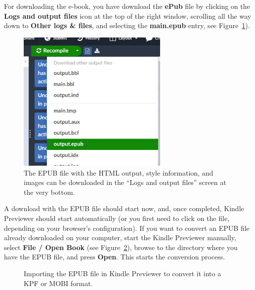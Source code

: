 For downloading the e-book, you have download the \textbf{ePub} file by clicking on the \textbf{Logs and output files} icon at the top of the right window, scrolling all the way down to \textbf{Other logs \& files}, and selecting the \textbf{main.epub} entry, see Figure~\ref{downloadepub:fig}). 

\begin{figure}[H]\centering
\includegraphics[width=0.65\textwidth]{images/downloadEPUB.jpg}
\caption{The EPUB file with the HTML output, style information, and images can be downloaded in the ``Logs and output files'' screen at the very bottom.}
\label{downloadepub:fig}
\end{figure}

A download with the EPUB file should start now, and, once completed, Kindle Previewer should start automatically (or you first need to click on the file, depending on your browser's configuration). If you want to convert an EPUB file already downloaded on your computer, start the Kindle Previewer manually, select \textbf{File / Open Book} (see Figure~\ref{kindlepreviewer:fig}), browse to the directory where you have the EPUB file, and press \textbf{Open}. This starts the conversion process.

\begin{figure}[H]\centering
{}
\caption{Importing the EPUB file in Kindle Previewer to convert it into a KPF or MOBI format.}
\label{kindlepreviewer:fig}
\end{figure}


